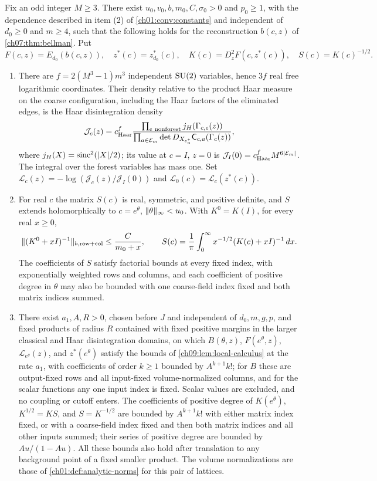 \begin{lemma}\label{ch09:lem:centered-white-coarea}
Fix an odd integer $M\ge3$. There exist $u_0,v_0,b,m_0,C,\sigma_0>0$ and $p_0\ge1$, with the dependence described in item (2) of \cref{ch01:conv:constants} and independent of $d_0\ge0$ and $m\ge4$, such that the following holds for the reconstruction $b(c,z)$ of \cref{ch07:thm:bellman}. Put
\[
 F(c,z)=E_{d_0}(b(c,z)),\quad z^*(c)=z_{d_0}^*(c),\quad K(c)=D_z^2F(c,z^*(c)),\quad S(c)=K(c)^{-1/2}.
\]
\begin{enumerate}
\item There are $f=2(M^3-1)m^3$ independent $\mathrm{SU}(2)$ variables, hence $3f$ real free logarithmic coordinates. Their density relative to the product Haar measure on the coarse configuration, including the Haar factors of the eliminated edges, is the Haar disintegration density
\[
 \mathcal J_c(z)=c_{\mathrm{Haar}}^f\frac{\prod_{e\text{ nonforest}}j_H(\Gamma_{c,e}(z))}{\prod_{a\in\mathcal E_{m}}\det D_{X_{e^*_a}}\mathsf C_{c,a}(\Gamma_c(z))},
\]
where $j_H(X)=\operatorname{sinc}^2(\lvert X\rvert/2)$; its value at $c=I$, $z=0$ is $\mathcal J_I(0)=c_{\mathrm{Haar}}^fM^{6\lvert \mathcal E_{m}\rvert}$.
The integral over the forest variables has mass one. Set $\mathcal L_c(z)=-\log(\mathcal J_c(z)/\mathcal J_I(0))$ and $\mathcal L_0(c)=\mathcal L_c(z^*(c))$.
\item For real $c$ the matrix $S(c)$ is real, symmetric, and positive definite, and $S$ extends holomorphically to $c=e^\theta$, $\lVert \theta\rVert_\infty<u_0$. With $K^0=K(I)$, for every real $x\ge0$,
\[
 \lVert (K^0+xI)^{-1}\rVert_{b,\mathrm{row+col}}\le\frac{C}{m_0+x},\qquad
 S(c)=\frac1\pi\int_0^\infty x^{-1/2}(K(c)+xI)^{-1}\,dx.
\]
The coefficients of $S$ satisfy factorial bounds at every fixed index, with exponentially weighted rows and columns, and each coefficient of positive degree in $\theta$ may also be bounded with one coarse-field index fixed and both matrix indices summed.
\item There exist $a_1,A,R>0$, chosen before $J$ and independent of $d_0,m,g,p$, and fixed products of radius $R$ contained with fixed positive margins in the larger classical and Haar disintegration domains, on which $B(\theta,z)$, $F(e^\theta,z)$, $\mathcal L_{e^\theta}(z)$, and $z^*(e^\theta)$ satisfy the bounds of \cref{ch09:lem:local-calculus} at the rate $a_1$, with coefficients of order $k\ge1$ bounded by $A^{k+1}k!$; for $B$ these are output-fixed rows and all input-fixed volume-normalized columns, and for the scalar functions any one input index is fixed. Scalar values are excluded, and no coupling or cutoff enters. The coefficients of positive degree of $K(e^\theta)$, $K^{1/2}=KS$, and $S=K^{-1/2}$ are bounded by $A^{k+1}k!$ with either matrix index fixed, or with a coarse-field index fixed and then both matrix indices and all other inputs summed; their series of positive degree are bounded by $Au/(1-Au)$. All these bounds also hold after translation to any background point of a fixed smaller product. The volume normalizations are those of \cref{ch01:def:analytic-norms} for this pair of lattices.

\end{enumerate}
\end{lemma}
